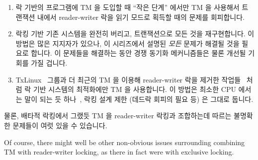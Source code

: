 \begin{enumerate}
\item	락 기반의 프로그램에 TM 을 도입할 때 ``작은 단계'' 에서만 TM 을
	사용해서 트랜잭션 내에서 reader-writer 락을 읽기 모드로 획득할 때의
	문제를 회피합니다.
\item	락킹 기반 기존 시스템을 완전히 버리고, 트랜잭션으로 모든 것을
	재구현합니다.
	이 방법은 많은 지지자가 있으나, 이 시리즈에서 설명된 \emph{모든} 문제가
	해결될 것을 필요로 합니다.
	이 문제들을 해결하는 동안 경쟁 동기화 메커니즘들은 물론 개선될 기회를
	가질 겁니다.
\item	TxLinux~\cite{ChistopherJRossbach2007a} 그룹과 더 최근의 TM 을 이용해
	reader-writer 락을 제거한 작업들~\cite{PascalFelber2016rwlockElision}
	처럼 락 기반 시스템의 최적화에만 TM 을 사용합니다.
	이 방법은 최소한  CPU 에서는 말이 되는 듯
	하나~\cite{Le:2015:TMS:3266491.3266500}, 락킹 설계 제한 (데드락 회피의
	필요 등) 은 그대로 둡니다.

\end{enumerate}

물론, 배타적 락킹에서 그랬듯 TM 을 reader-writer 락킹과 조합하는데 따르는
불명확한 문제들이 여럿 있을 수 있습니다.

\iffalse

Of course, there might well be other non-obvious issues surrounding
combining TM with reader-writer locking, as there in fact were with
exclusive locking.

